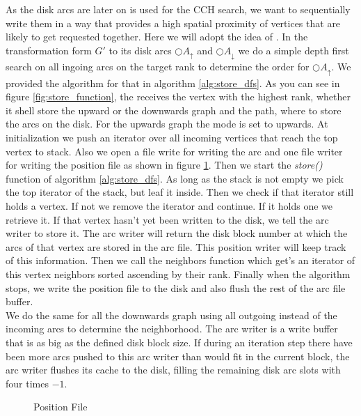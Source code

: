 As the disk arcs are later on is used for the CCH search, we want to sequentially write them in a way that provides a high spatial proximity of vertices that are likely to get requested together. Here we will adopt the idea of \cite[Mobile Route Planning]{Sanders}. In the transformation form $G'$ to its disk arcs $\bigcirc A_\uparrow$ 
and $\bigcirc A_\downarrow$ we do a simple depth first search on all ingoing arcs on the target rank to determine the order for $\bigcirc A_\uparrow$. We provided the algorithm for that in algorithm \ref{alg:store_dfs}. As you can see in figure \ref{fig:store_function}, the receives the vertex with the highest rank, whether it shell 
store the upward or the downwards graph and the path, where to store the arcs on the disk. For the upwards graph the mode is set to upwards. At initialization we push an iterator over all incoming vertices that reach the top vertex to stack. Also we open a file write for writing the arc and one file writer for writing the position file as shown in figure \ref{fig:position_file}.
Then we start the \textit{store()} function of algorithm \ref{alg:store_dfs}. As long as the stack is not empty we pick the top iterator of the stack, but leaf it inside. Then we check if that iterator still holds a vertex. If not we remove the iterator and continue. If it holds one we retrieve it. If that vertex hasn't yet been written to the disk,
we tell the arc writer to store it. The arc writer will return the disk block number at which the arcs of that vertex are stored in the arc file. This position writer will keep track of this information. Then we call the neighbors function which get's an iterator of this vertex neighbors sorted ascending by their rank. Finally when the algorithm stops, we write the 
position file to the disk and also flush the rest of the arc file buffer.
\\
We do the same for all the downwards graph using all outgoing instead of the incoming arcs to determine the neighborhood. The arc writer is a write buffer that is as big as the defined disk block size. If during an iteration step there have been more arcs pushed to this arc writer than would fit in the current block, the arc writer flushes 
its cache to the disk, filling the remaining disk arc slots with four times $-1$.

\begin{figure}
    \centering
    
    \caption{Position File}
    \label{fig:position_file}
\end{figure}

